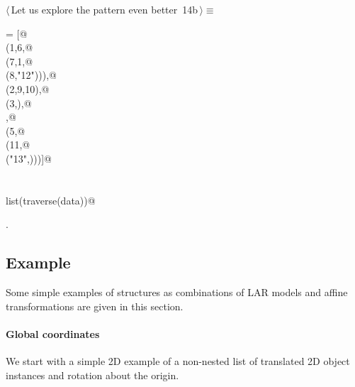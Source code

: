 \documentclass[11pt,oneside]{article}	%
\begin{document}
\begin{flushleft} \small \label{scrap29}
\protect{}$\langle\,$Let us explore the pattern even better\nobreak\ {\footnotesize 14b}$\,\rangle\equiv$
\vspace{-1ex}
\begin{list}{}{} \item
\mbox{}\verb@data = [@\\
\mbox{}\verb@   (1,6,@\\
\mbox{}\verb@      (7,1,@\\
\mbox{}\verb@         (8,"12"))),@\\
\mbox{}\verb@   (2,9,10),@\\
\mbox{}\verb@   (3,),@\\
\mbox{},@\\
\mbox{}\verb@   (5,@\\
\mbox{}\verb@      (11,@\\
\mbox{}\verb@      ("13",)))]@\\
\mbox{}\verb@@\\
\mbox{}\verb@@\\
\mbox{}\verb@print list(traverse(data))@\\
\mbox{}\verb@@{\NWsep}
\end{list}
\vspace{-1ex}
\footnotesize\addtolength{\baselineskip}{-1ex}
\begin{list}{}{\setlength{\itemsep}{-\parsep}\setlength{\itemindent}{-\leftmargin}}
\item {\NWtxtMacroNoRef}.
\end{list}
\end{flushleft}

\subsection{Example}
Some simple examples of structures as combinations of LAR models and affine transformations are given in this section. 

\paragraph{Global coordinates}
We start with a simple 2D example of a non-nested list of translated 2D object instances and rotation about the origin.
\end{document}
